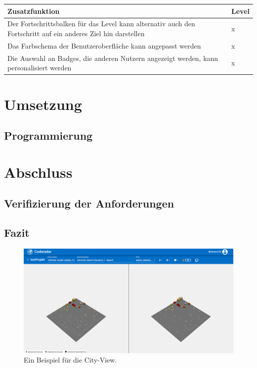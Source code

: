 \documentclass[
	oneside,  %
	ngerman, 
	final, 
	11pt, 
	a4paper, 
	1.1headlines, 
	headinclude=false, 
	footinclude=false, 
	mpinclude=false, 
	pagesize, 
	onecolumn, 
	titlepage, 
	parskip=half, 
	headsepline, 
	chapterprefix=false, 
	version=first, 
	listof=totoc, 
	bibliography=totoc, 
	toc=graduated, 
	fleqn
]{scrbook}
\begin{document}
\begin{center}
	\begin{tabular}{|p{12cm}|p{1cm}|}
		\hline
		Zusatzfunktion & Level \\ \hline
		Der Fortschrittsbalken für das Level kann alternativ auch den Fortschritt auf ein anderes Ziel hin darstellen & x \\ \hline
		Das Farbschema der Benutzeroberfläche kann angepasst werden & x \\ \hline
		Die Auswahl an Badges, die anderen Nutzern angezeigt werden, kann personalisiert werden & x \\ \hline
	\end{tabular}
\end{center}

\chapter{Umsetzung}
\label{Umsetzung}


\section{Programmierung}
\label{Programmierung}


\chapter{Abschluss}
\label{Abschluss}


\section{Verifizierung der Anforderungen}
\label{Verifizierung_Anforderungen}


\section{Fazit}
\label{Fazit}


\begin{figure}[htb]
	\begin{center}
		\includegraphics[width=\linewidth]{images/city_view}
		\caption{Ein Beispiel für die City-View.}
		\label{city_view}
	\end{center}
\end{figure}
\end{document}
